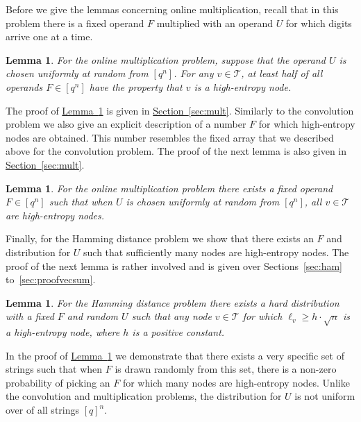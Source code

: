 \documentclass[11pt]{article}
\numberwithin{equation}{section}
\newtheorem{lemma}[theorem]{Lemma}
\theoremstyle{definition}
\theoremstyle{plain}
\newcommand{\expref}[2]{\hyperref[#2]{#1~\ref{#2}}}
\newcommand{\calT}{\ensuremath{\mathcal{T}}}
\begin{document}
Before we give the lemmas concerning online multiplication, recall that in this problem there is a fixed operand $F$ multiplied with an operand $U$ for which digits arrive one at a time.

\begin{lemma}
	\label{lem:mult-rand-H-lower}
	For the online multiplication problem, suppose that the operand $U$ is chosen uniformly at random from $[q^n]$. For any $v \in \calT$, at least half of all operands $F\in [q^n]$ have the property that $v$ is a high-entropy node.
\end{lemma}

The proof of \expref{Lemma}{lem:mult-rand-H-lower} is given in \expref{Section}{sec:mult}. Similarly to the convolution problem we also give an explicit description of a number $F$ for which high-entropy nodes are obtained. This number resembles the fixed array that we described above for the convolution problem.
The proof of the next lemma is also given in \expref{Section}{sec:mult}.

\begin{lemma}
	\label{lem:mult-H-lower}
	For the online multiplication problem there exists a fixed operand $F\in [q^n]$ such that when $U$ is chosen uniformly at random from $[q^n]$, all $v \in \calT$ are high-entropy nodes.
\end{lemma}

Finally, for the Hamming distance problem we show that there exists an $F$ and distribution for $U$ such that sufficiently many nodes are high-entropy nodes. The proof of the next lemma is rather involved and is given over
%
Sections~\ref{sec:ham} to~\ref{sec:proofvecsum}.

\begin{lemma}
	\label{lem:ham-H-lower}
	For the Hamming distance problem there exists a hard distribution with a fixed $F$ and random $U$ such that any node $v\in\calT$ for which $\ell_v\geq h \cdot \sqrt{n}$ is a high-entropy node,
	where $h$ is a positive constant.
\end{lemma}

In the proof of \expref{Lemma}{lem:ham-H-lower} we demonstrate that there exists a very specific set of strings such that when $F$ is drawn randomly from this set, there is a non-zero probability of picking an $F$ for which many nodes are high-entropy nodes.
Unlike the convolution and multiplication problems, the distribution for $U$ is not uniform over of all strings $[q]^n$.
\end{document}
